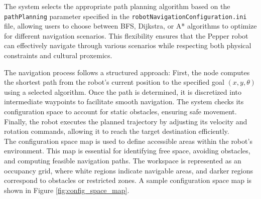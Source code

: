 \documentclass{CSSRforAfrica}
\begin{document}
\noindent The system selects the appropriate path planning algorithm based on the \texttt{pathPlanning} parameter specified in the \texttt{robotNavigationConfiguration.ini} file, allowing users to choose between BFS, Dijkstra, or A* algorithms to optimize for different navigation scenarios. This flexibility ensures that the Pepper robot can effectively navigate through various scenarios while respecting both physical constraints and cultural proxemics.


\noindent The navigation process follows a structured approach: First, the node computes the shortest path from the robot’s current position to the specified goal \( (x, y, \theta) \) using a selected algorithm. Once the path is determined, it is discretized into intermediate waypoints to facilitate smooth navigation. The system checks its configuration space to account for static obstacles, ensuring safe movement. Finally, the robot executes the planned trajectory by adjusting its velocity and rotation commands, allowing it to reach the target destination efficiently.\\


\noindent The configuration space map is used to define accessible areas within the robot’s environment. This map is essential for identifying free space, avoiding obstacles, and computing feasible navigation paths. The workspace is represented as an occupancy grid, where white regions indicate navigable areas, and darker regions correspond to obstacles or restricted zones. A sample configuration space map is shown in Figure \ref{fig:config_space_map}.
\end{document}
